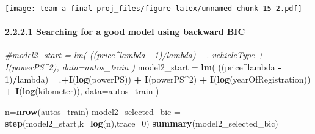 \documentclass[]{article}
\newenvironment{Shaded}{\begin{snugshade}}{\end{snugshade}}
\newcommand{\CommentTok}[1]{\textcolor[rgb]{0.56,0.35,0.01}{\textit{#1}}}
\newcommand{\DataTypeTok}[1]{\textcolor[rgb]{0.13,0.29,0.53}{#1}}
\newcommand{\DecValTok}[1]{\textcolor[rgb]{0.00,0.00,0.81}{#1}}
\newcommand{\KeywordTok}[1]{\textcolor[rgb]{0.13,0.29,0.53}{\textbf{#1}}}
\newcommand{\NormalTok}[1]{#1}
\newcommand{\OperatorTok}[1]{\textcolor[rgb]{0.81,0.36,0.00}{\textbf{#1}}}
\newcommand{\StringTok}[1]{\textcolor[rgb]{0.31,0.60,0.02}{#1}}
\let\oldparagraph\paragraph
\renewcommand{\paragraph}[1]{\oldparagraph{#1}\mbox{}}
\begin{document}
\texttt{[image: team-a-final-proj\_files/figure-latex/unnamed-chunk-15-2.pdf]}

\hypertarget{searching-for-a-good-model-using-backward-bic}{%
\paragraph{2.2.2.1 Searching for a good model using backward
BIC}\label{searching-for-a-good-model-using-backward-bic}}

\begin{Shaded}
\begin{Highlighting}[]
\CommentTok{#model2_start = lm( ((price^lambda - 1)/lambda) ~ .-vehicleType +  I(powerPS^2), data=autos_train ) }
\NormalTok{model2_start =}\StringTok{ }\KeywordTok{lm}\NormalTok{( ((price}\OperatorTok{^}\NormalTok{lambda }\OperatorTok{-}\StringTok{ }\DecValTok{1}\NormalTok{)}\OperatorTok{/}\NormalTok{lambda) }\OperatorTok{~}\StringTok{ }\NormalTok{.}\OperatorTok{+}\KeywordTok{I}\NormalTok{(}\KeywordTok{log}\NormalTok{(powerPS)) }\OperatorTok{+}\StringTok{ }\KeywordTok{I}\NormalTok{(powerPS}\OperatorTok{^}\DecValTok{2}\NormalTok{) }\OperatorTok{+}\StringTok{ }\KeywordTok{I}\NormalTok{(}\KeywordTok{log}\NormalTok{(yearOfRegistration)) }\OperatorTok{+}\StringTok{ }\KeywordTok{I}\NormalTok{(}\KeywordTok{log}\NormalTok{(kilometer)), }\DataTypeTok{data=}\NormalTok{autos_train ) }

\NormalTok{n=}\KeywordTok{nrow}\NormalTok{(autos_train)}
\NormalTok{model2_selected_bic =}\StringTok{ }\KeywordTok{step}\NormalTok{(model2_start,}\DataTypeTok{k=}\KeywordTok{log}\NormalTok{(n),}\DataTypeTok{trace=}\DecValTok{0}\NormalTok{)}
\KeywordTok{summary}\NormalTok{(model2_selected_bic)}
\end{Highlighting}
\end{Shaded}
\end{document}
